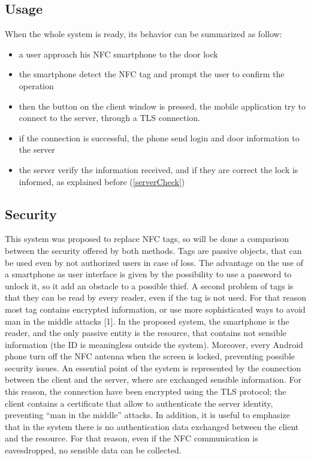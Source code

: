 \documentclass[conference]{IEEEtran}
\begin{document}
\subsection{Usage}

When the whole system is ready, its behavior can be summarized as follow:
\begin{itemize}
 \item a user approach his NFC smartphone to the door lock
 \item the smartphone detect the NFC tag and prompt the user to confirm the operation
 \item then the button on the client window is pressed, the mobile application try to connect to the server, through a TLS connection.
 \item if the connection is successful, the phone send login and door information to the server
 \item the server verify the information received, and if they are correct the lock is informed,  as explained before (\ref{serverCheck})
\end{itemize}

\subsection{Security}

This system was proposed to replace NFC tags, so will be done a comparison between the security offered by both methods.
Tags are passive objects, that can be used even by not authorized users in case of loss. The advantage on the use of a smartphone as user interface is given by the possibility to use a password to unlock it, so it add an obstacle to a possible thief.
A second problem of tags is that they can be read by every reader, even if the tag is not used. For that reason most tag contains encrypted information, or use more sophisticated ways to avoid man in the middle attacks [1].
In the proposed system, the smartphone is the reader, and the only passive entity is the resource, that contains not sensible information (the ID is meaningless outside the system). Moreover, every Android phone turn off the NFC antenna when the screen is locked, preventing possible security issues.
An essential point of the system is represented by the connection between the client and the server, where are exchanged sensible information. For this reason, the connection have been encrypted using the TLS protocol; the client contains a certificate that allow to authenticate the server identity, preventing ``man in the middle'' attacks.
In addition, it is useful to emphasize that in the system there is no authentication data exchanged between the client and the resource. For that reason, even if the NFC communication is eavesdropped, no sensible data can be collected.
\end{document}
